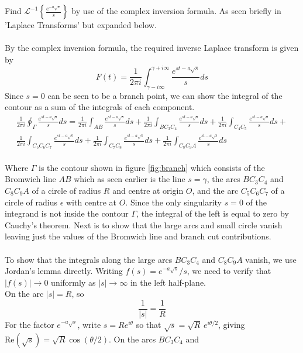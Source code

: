 Find $\mathcal{L}^{-1}\left\{\frac{e^{-a\sqrt{s}}}{s}\right\}$ by use of the complex inversion formula. As seen briefly in 'Laplace Transforms' \cite{TransformsTheory} but expanded below. 
\\
\\
By the complex inversion formula, the required inverse Laplace transform is given by 
\begin{equation}\label{Eq:}
    F(t)=\frac{1}{2\pi i}\int^{\gamma+i\infty}_{\gamma-i\infty}\frac{e^{st-a\sqrt{s}}}{s}ds
\end{equation}
Since $s=0$ can be seen to be a branch point, we can show the integral of the contour as a sum of the integrals of each component.
\begin{align*}
    \frac{1}{2\pi i}\oint_{\Gamma}\frac{e^{st-a\sqrt{s}}}{s}ds=\frac{1}{2\pi i}\int_{AB}\frac{e^{st-a\sqrt{s}}}{s}ds+\frac{1}{2\pi i}\int_{BC_3C_4}\frac{e^{st-a\sqrt{s}}}{s}ds+
    \frac{1}{2\pi i}\int_{C_4C_5}\frac{e^{st-a\sqrt{s}}}{s}ds+\\ \frac{1}{2\pi i}\int_{C_5C_6C_7}\frac{e^{st-a\sqrt{s}}}{s}ds+\frac{1}{2\pi i}\int_{C_7C_8}\frac{e^{st-a\sqrt{s}}}{s}ds+\frac{1}{2\pi i}\int_{C_8C_9A}\frac{e^{st-a\sqrt{s}}}{s}ds
\end{align*}
\\
Where $\Gamma$ is the contour shown in figure \ref{fig:branch} which consists of the Bromwich line $AB$ which as seen earlier is the line  $s=\gamma$, the arcs $BC_3C_4$ and $C_8C_9A$ of a circle of radius $R$ and centre at origin $O$, and the arc $C_5C_6C_7$ of a circle of radius $\epsilon$ with centre at $O$. 
Since the only singularity $s=0$ of the integrand is not inside the contour $\Gamma$, the integral of the left is equal to zero by Cauchy's theorem. Next is to show that the large arcs and small circle vanish leaving just the values of the Bromwich line and branch cut contributions.
\\
\\
To show that the integrals along the large arcs $BC_3C_4$ and $C_8C_9A$ vanish,
we use Jordan's lemma directly. Writing $f(s) = e^{-a\sqrt{s}}/s$, we need to
verify that $|f(s)| \to 0$ uniformly as $|s| \to \infty$ in the left half-plane.
\\
On the arc $|s| = R$, so
\begin{equation}
    \frac{1}{|s|} = \frac{1}{R}
\end{equation}
For the factor $e^{-a\sqrt{s}}$, write $s = Re^{i\theta}$ so that
$\sqrt{s} = \sqrt{R}\,e^{i\theta/2}$, giving
$\mathrm{Re}(\sqrt{s}) = \sqrt{R}\cos(\theta/2)$. On the arcs $BC_3C_4$ and
